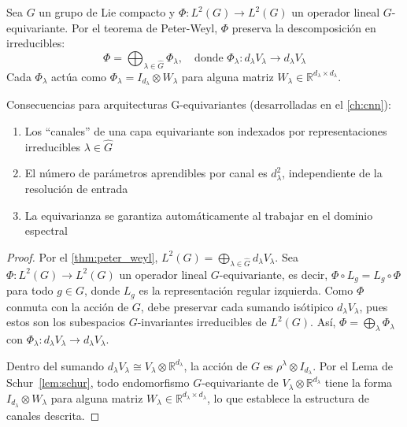 \begin{corollary}\label{cor:peter_weyl_gcnn}
	Sea $G$ un grupo de Lie compacto y $\Phi: L^2(G) \to L^2(G)$ un operador lineal $G$-equivariante. Por el teorema de Peter-Weyl, $\Phi$ preserva la descomposición en irreducibles:
	\[
		\Phi = \bigoplus_{\lambda \in \widehat{G}} \Phi_\lambda, \quad \text{donde } \Phi_\lambda: d_\lambda V_\lambda \to d_\lambda V_\lambda
	\]
	Cada $\Phi_\lambda$ actúa como $\Phi_\lambda = I_{d_\lambda} \otimes W_\lambda$ para alguna matriz $W_\lambda \in \mathbb{R}^{d_\lambda \times d_\lambda}$.

	Consecuencias para arquitecturas G-equivariantes (desarrolladas en el \autoref{ch:cnn}):
	\begin{enumerate}
		\item Los ``canales'' de una capa equivariante son indexados por representaciones irreducibles $\lambda \in \widehat{G}$
		\item El número de parámetros aprendibles por canal es $d_\lambda^2$, independiente de la resolución de entrada
		\item La equivarianza se garantiza automáticamente al trabajar en el dominio espectral
	\end{enumerate}
\end{corollary}

\begin{proof}
Por el \autoref{thm:peter_weyl}, $L^2(G) = \bigoplus_{\lambda \in \widehat{G}} d_\lambda V_\lambda$. Sea $\Phi: L^2(G) \to L^2(G)$ un operador lineal $G$-equivariante, es decir, $\Phi \circ L_g = L_g \circ \Phi$ para todo $g \in G$, donde $L_g$ es la representación regular izquierda. Como $\Phi$ conmuta con la acción de $G$, debe preservar cada sumando isótipico $d_\lambda V_\lambda$, pues estos son los subespacios $G$-invariantes irreducibles de $L^2(G)$. Así, $\Phi = \bigoplus_\lambda \Phi_\lambda$ con $\Phi_\lambda: d_\lambda V_\lambda \to d_\lambda V_\lambda$.

Dentro del sumando $d_\lambda V_\lambda \cong V_\lambda \otimes \mathbb{R}^{d_\lambda}$, la acción de $G$ es $\rho^\lambda \otimes I_{d_\lambda}$. Por el Lema de Schur~\ref{lem:schur}, todo endomorfismo $G$-equivariante de $V_\lambda \otimes \mathbb{R}^{d_\lambda}$ tiene la forma $I_{d_\lambda} \otimes W_\lambda$ para alguna matriz $W_\lambda \in \mathbb{R}^{d_\lambda \times d_\lambda}$, lo que establece la estructura de canales descrita.
\end{proof}

